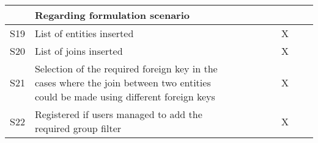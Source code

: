 \begin{longtable}{@{}lm{7cm}ccccccc@{}}
                & \textbf{Regarding formulation scenario}                                                                                                                 &                                                &                                                &                                                &                                                &                                                &                                                &                                                \\* \midrule
    S19         & List of entities inserted                                                                                                                               &                                                &                                                &                                                &                                                & X                                              &                                                &                                                \\
    S20         & List of joins inserted                                                                                                                                  &                                                &                                                &                                                &                                                & X                                              &                                                &                                                \\
    S21         & Selection of the required foreign key in the cases where the join between two entities could be made using different foreign keys                       &                                                &                                                &                                                &                                                & X                                              &                                                &                                                \\
    S22         & Registered if users managed to add the required group filter                                                                                            &                                                &                                                &                                                &                                                & X                                              &                                                &                                                \\

\end{longtable}
